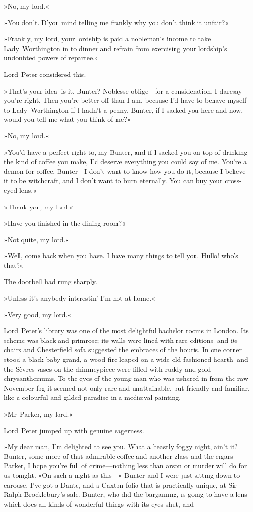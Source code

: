 »No, my lord.«

»You don't. D'you mind telling me frankly why you don't think it unfair?«

»Frankly, my lord, your lordship is paid a nobleman's income to take Lady~Worthington in to dinner and refrain from exercising your lordship's undoubted powers of repartee.«

Lord~Peter considered this.

»That's your idea, is it, Bunter? Noblesse oblige—for a consideration. I daresay you're right. Then you're better off than I am, because I'd have to behave myself to Lady~Worthington if I hadn't a penny. Bunter, if I sacked you here and now, would you tell me what you think of me?«

»No, my lord.«

»You'd have a perfect right to, my Bunter, and if I sacked you on top of drinking the kind of coffee you make, I'd deserve everything you could say of me. You're a demon for coffee, Bunter—I don't want to know how you do it, because I believe it to be witchcraft, and I don't want to burn eternally. You can buy your cross-eyed lens.«

»Thank you, my lord.«

»Have you finished in the dining-room?«

»Not quite, my lord.«

»Well, come back when you have. I have many things to tell you. Hullo! who's that?«

The doorbell had rung sharply.

»Unless it's anybody interestin' I'm not at home.«

»Very good, my lord.«

Lord~Peter's library was one of the most delightful bachelor rooms in London. Its scheme was black and primrose; its walls were lined with rare editions, and its chairs and Chesterfield sofa suggested the embraces of the houris. In one corner stood a black baby grand, a wood fire leaped on a wide old-fashioned hearth, and the Sèvres vases on the chimneypiece were filled with ruddy and gold chrysanthemums. To the eyes of the young man who was ushered in from the raw November fog it seemed not only rare and unattainable, but friendly and familiar, like a colourful and gilded paradise in a mediæval painting.

»Mr~Parker, my lord.«

Lord~Peter jumped up with genuine eagerness.

»My dear man, I'm delighted to see you. What a beastly foggy night, ain't it? Bunter, some more of that admirable coffee and another glass and the cigars. Parker, I hope you're full of crime—nothing less than arson or murder will do for us tonight. »On such a night as this---« Bunter and I were just sitting down to carouse. I've got a Dante, and a Caxton folio that is practically unique, at Sir Ralph Brocklebury's sale. Bunter, who did the bargaining, is going to have a lens which does all kinds of wonderful things with its eyes shut, and

